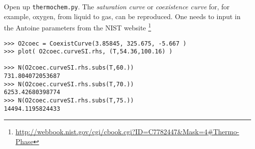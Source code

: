 \documentclass[10pt]{amsart}
\begin{document}
\begin{multicols*}{2}
Open up \verb|thermochem.py|.  The \emph{saturation curve} or \emph{coexistence curve} for, for example, oxygen, from liquid to gas, can be reproduced.  One needs to input in the Antoine parameters from the NIST website \footnote{\url{http://webbook.nist.gov/cgi/cbook.cgi?ID=C7782447&Mask=4\#Thermo-Phase}}

\begin{lstlisting}
>>> O2coec = CoexistCurve(3.85845, 325.675, -5.667 )                                            
>>> plot( O2coec.curveSI.rhs, (T,54.36,100.16) )   

>>> N(O2coec.curveSI.rhs.subs(T,60.))
731.804072053687
>>> N(O2coec.curveSI.rhs.subs(T,70.))
6253.42680398774
>>> N(O2coec.curveSI.rhs.subs(T,75.))
14494.1195824433
\end{lstlisting}

  \quad \quad \quad {}  













\end{multicols*}
\end{document}
